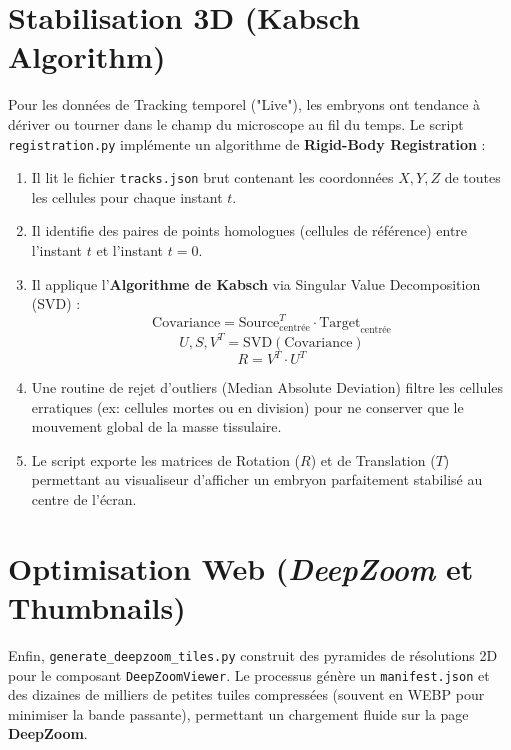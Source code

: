 \section{Stabilisation 3D (Kabsch Algorithm)}
Pour les données de Tracking temporel ("Live"), les embryons ont tendance à dériver ou tourner dans le champ du microscope au fil du temps.
Le script \texttt{registration.py} implémente un algorithme de \textbf{Rigid-Body Registration} :
\begin{enumerate}
    \item Il lit le fichier \texttt{tracks.json} brut contenant les coordonnées $X, Y, Z$ de toutes les cellules pour chaque instant $t$.
    \item Il identifie des paires de points homologues (cellules de référence) entre l'instant $t$ et l'instant $t=0$.
    \item Il applique l'\textbf{Algorithme de Kabsch} via Singular Value Decomposition (SVD) :
    \begin{equation}
        \text{Covariance} = \text{Source}_{\text{centrée}}^T \cdot \text{Target}_{\text{centrée}}
    \end{equation}
    \begin{equation}
        U, S, V^T = \text{SVD}(\text{Covariance})
    \end{equation}
    \begin{equation}
        R = V^T \cdot U^T
    \end{equation}
    \item Une routine de rejet d'outliers (Median Absolute Deviation) filtre les cellules erratiques (ex: cellules mortes ou en division) pour ne conserver que le mouvement global de la masse tissulaire.
    \item Le script exporte les matrices de Rotation ($R$) et de Translation ($T$) permettant au visualiseur d'afficher un embryon parfaitement stabilisé au centre de l'écran.
\end{enumerate}

\section{Optimisation Web (\textit{DeepZoom} et Thumbnails)}
Enfin, \texttt{generate\_deepzoom\_tiles.py} construit des pyramides de résolutions 2D pour le composant \texttt{DeepZoomViewer}. Le processus génère un \texttt{manifest.json} et des dizaines de milliers de petites tuiles compressées (souvent en WEBP pour minimiser la bande passante), permettant un chargement fluide sur la page \textbf{DeepZoom}.
